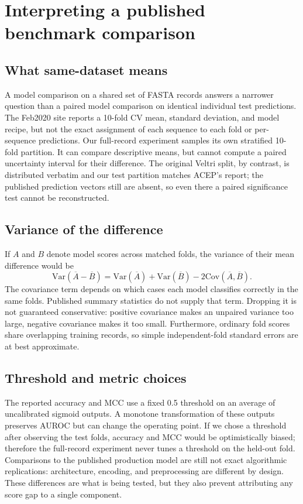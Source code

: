 \section{Interpreting a published benchmark comparison}
\label{sec:comparison-theory}

\subsection{What same-dataset means}
A model comparison on a shared set of FASTA records answers a narrower
question than a paired model comparison on identical individual test
predictions. The Feb2020 site reports a 10-fold CV mean, standard deviation,
and model recipe, but not the exact assignment of each sequence to each
fold or per-sequence predictions. Our full-record experiment samples its own
stratified 10-fold partition. It can compare descriptive means, but cannot
compute a paired uncertainty interval for their difference. The original
Veltri split, by contrast, is distributed verbatim and our test partition
matches ACEP's report; the published prediction vectors still are absent,
so even there a paired significance test cannot be reconstructed.

\subsection{Variance of the difference}
If $A$ and $B$ denote model scores across matched folds, the variance of
their mean difference would be
\begin{equation}
\mathrm{Var}(\overline{A}-\overline{B}) =
\mathrm{Var}(\overline{A}) + \mathrm{Var}(\overline{B})
- 2\mathrm{Cov}(\overline{A},\overline{B}).
\label{eq:pairedvariance}
\end{equation}
The covariance term depends on which cases each model classifies correctly
in the same folds. Published summary statistics do not supply that term.
Dropping it is not guaranteed conservative: positive covariance makes an
unpaired variance too large, negative covariance makes it too small.
Furthermore, ordinary fold scores share overlapping training records, so
simple independent-fold standard errors are at best approximate.

\subsection{Threshold and metric choices}
The reported accuracy and MCC use a fixed 0.5 threshold on an average of
uncalibrated sigmoid outputs. A monotone transformation of these outputs
preserves AUROC but can change the operating point. If we chose a threshold
after observing the test folds, accuracy and MCC would be optimistically
biased; therefore the full-record experiment never tunes a threshold on
the held-out fold. Comparisons to the published production model are still
not exact algorithmic replications: architecture, encoding, and preprocessing
are different by design. These differences are what is being tested, but
they also prevent attributing any score gap to a single component.

